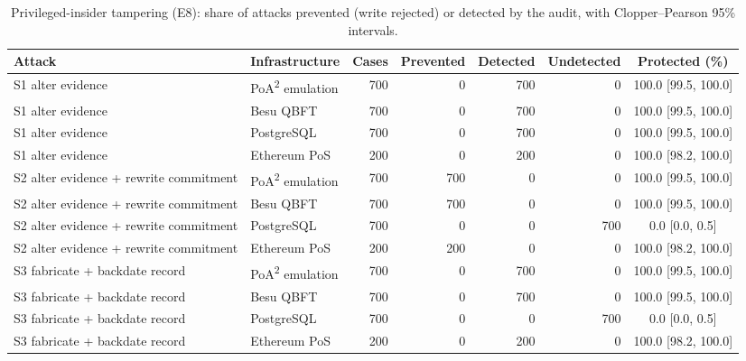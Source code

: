 \begin{table}[t]
\centering
\scriptsize
\caption{Privileged-insider tampering (E8): share of attacks prevented (write rejected) or detected by the audit, with Clopper--Pearson 95\% intervals.}
\label{tab:insider}
\begin{tabular}{llrrrrc}
\toprule
Attack & Infrastructure & Cases & Prevented & Detected & Undetected & Protected (\%) \\
\midrule
S1 alter evidence & PoA\textsuperscript{2} emulation & 700 & 0 & 700 & 0 & 100.0 [99.5, 100.0] \\
S1 alter evidence & Besu QBFT & 700 & 0 & 700 & 0 & 100.0 [99.5, 100.0] \\
S1 alter evidence & PostgreSQL & 700 & 0 & 700 & 0 & 100.0 [99.5, 100.0] \\
S1 alter evidence & Ethereum PoS & 200 & 0 & 200 & 0 & 100.0 [98.2, 100.0] \\
S2 alter evidence + rewrite commitment & PoA\textsuperscript{2} emulation & 700 & 700 & 0 & 0 & 100.0 [99.5, 100.0] \\
S2 alter evidence + rewrite commitment & Besu QBFT & 700 & 700 & 0 & 0 & 100.0 [99.5, 100.0] \\
S2 alter evidence + rewrite commitment & PostgreSQL & 700 & 0 & 0 & 700 & 0.0 [0.0, 0.5] \\
S2 alter evidence + rewrite commitment & Ethereum PoS & 200 & 200 & 0 & 0 & 100.0 [98.2, 100.0] \\
S3 fabricate + backdate record & PoA\textsuperscript{2} emulation & 700 & 0 & 700 & 0 & 100.0 [99.5, 100.0] \\
S3 fabricate + backdate record & Besu QBFT & 700 & 0 & 700 & 0 & 100.0 [99.5, 100.0] \\
S3 fabricate + backdate record & PostgreSQL & 700 & 0 & 0 & 700 & 0.0 [0.0, 0.5] \\
S3 fabricate + backdate record & Ethereum PoS & 200 & 0 & 200 & 0 & 100.0 [98.2, 100.0] \\
\bottomrule
\end{tabular}
\end{table}
